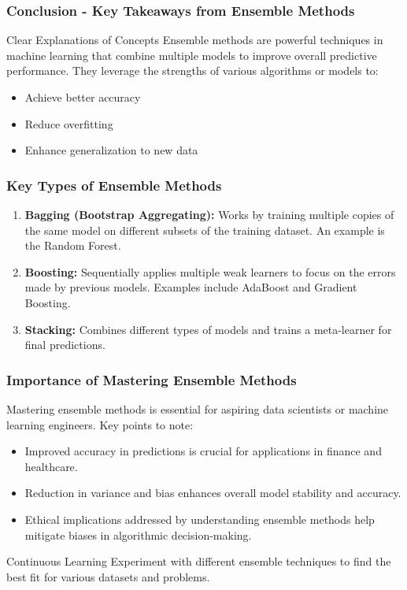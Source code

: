 \documentclass[aspectratio=169]{beamer}
\begin{document}
\begin{frame}[fragile]
    \frametitle{Conclusion - Key Takeaways from Ensemble Methods}
    \begin{block}{Clear Explanations of Concepts}
        Ensemble methods are powerful techniques in machine learning that combine multiple models to improve overall predictive performance. They leverage the strengths of various algorithms or models to:
        \begin{itemize}
            \item Achieve better accuracy
            \item Reduce overfitting
            \item Enhance generalization to new data
        \end{itemize}
    \end{block}
\end{frame}

\begin{frame}[fragile]
    \frametitle{Key Types of Ensemble Methods}
    \begin{enumerate}
        \item \textbf{Bagging (Bootstrap Aggregating):} Works by training multiple copies of the same model on different subsets of the training dataset. An example is the Random Forest.
        
        \item \textbf{Boosting:} Sequentially applies multiple weak learners to focus on the errors made by previous models. Examples include AdaBoost and Gradient Boosting.
        
        \item \textbf{Stacking:} Combines different types of models and trains a meta-learner for final predictions.
    \end{enumerate}
\end{frame}

\begin{frame}[fragile]
    \frametitle{Importance of Mastering Ensemble Methods}
    Mastering ensemble methods is essential for aspiring data scientists or machine learning engineers. Key points to note:
    \begin{itemize}
        \item Improved accuracy in predictions is crucial for applications in finance and healthcare.
        \item Reduction in variance and bias enhances overall model stability and accuracy.
        \item Ethical implications addressed by understanding ensemble methods help mitigate biases in algorithmic decision-making.
    \end{itemize}
    \begin{block}{Continuous Learning}
        Experiment with different ensemble techniques to find the best fit for various datasets and problems.
    \end{block}
\end{frame}
\end{document}
